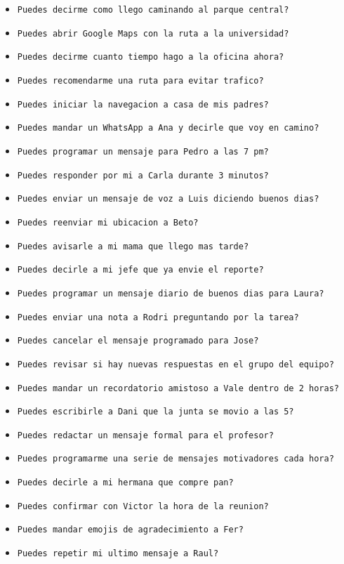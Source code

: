 \documentclass[a4paper,12pt]{article}
\begin{document}
\begin{itemize}
    \item \texttt{Puedes decirme como llego caminando al parque central?}
    \item \texttt{Puedes abrir Google Maps con la ruta a la universidad?}
    \item \texttt{Puedes decirme cuanto tiempo hago a la oficina ahora?}
    \item \texttt{Puedes recomendarme una ruta para evitar trafico?}
    \item \texttt{Puedes iniciar la navegacion a casa de mis padres?}
    \item \texttt{Puedes mandar un WhatsApp a Ana y decirle que voy en camino?}
    \item \texttt{Puedes programar un mensaje para Pedro a las 7 pm?}
    \item \texttt{Puedes responder por mi a Carla durante 3 minutos?}
    \item \texttt{Puedes enviar un mensaje de voz a Luis diciendo buenos dias?}
    \item \texttt{Puedes reenviar mi ubicacion a Beto?}
    \item \texttt{Puedes avisarle a mi mama que llego mas tarde?}
    \item \texttt{Puedes decirle a mi jefe que ya envie el reporte?}
    \item \texttt{Puedes programar un mensaje diario de buenos dias para Laura?}
    \item \texttt{Puedes enviar una nota a Rodri preguntando por la tarea?}
    \item \texttt{Puedes cancelar el mensaje programado para Jose?}
    \item \texttt{Puedes revisar si hay nuevas respuestas en el grupo del equipo?}
    \item \texttt{Puedes mandar un recordatorio amistoso a Vale dentro de 2 horas?}
    \item \texttt{Puedes escribirle a Dani que la junta se movio a las 5?}
    \item \texttt{Puedes redactar un mensaje formal para el profesor?}
    \item \texttt{Puedes programarme una serie de mensajes motivadores cada hora?}
    \item \texttt{Puedes decirle a mi hermana que compre pan?}
    \item \texttt{Puedes confirmar con Victor la hora de la reunion?}
    \item \texttt{Puedes mandar emojis de agradecimiento a Fer?}
    \item \texttt{Puedes repetir mi ultimo mensaje a Raul?}

\end{itemize}
\end{document}
